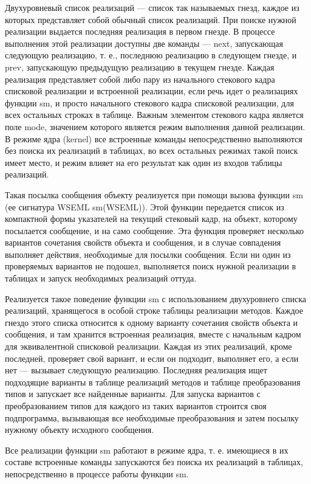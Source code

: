 \documentclass{report}
\begin{document}
    Двухуровневый список реализаций --- список так называемых гнезд, каждое из которых представляет собой обычный список реализаций. При поиске нужной реализации выдается последняя реализация в первом гнезде. В процессе выполнения этой реализации доступны две команды --- next, запускающая следующую реализацию, т. е., последнюю реализацию в следующем гнезде, и prev, запускающую предыдущую реализацию в текущем гнезде. Каждая реализация представляет собой либо пару из начального стекового кадра списковой реализации и встроенной реализации, если речь идет о реализациях функции sm, и просто начального стекового кадра списковой реализации, для всех остальных строках в таблице. Важным элементом стекового кадра является поле mode, значением которого является режим выполнения данной реализации. В режиме ядра (kernel) все встроенные команды непосредственно выполняются без поиска их реализаций в таблицах, во всех остальных режимах такой поиск имеет место, и режим влияет на его результат как один из входов таблицы реализаций.

    Такая посылка сообщения объекту реализуется при помощи вызова функции sm (ее сигнатура WSEML sm(WSEML)). Этой функции передается список из компактной формы указателей на текущий стековый кадр, на объект, которому посылается сообщение, и на само сообщение. Эта функция проверяет несколько вариантов сочетания свойств объекта и сообщения, и в случае совпадения выполняет действия, необходимые для посылки сообщения. Если ни один из проверяемых вариантов не подошел, выполняется поиск нужной реализации в таблицах и запуск необходимых реализаций оттуда.

    Реализуется такое поведение функции sm с использованием двухуровнего списка реализаций, хранящегося в особой строке таблицы реализации методов. Каждое гнездо этого списка относится к одному варианту сочетания свойств объекта и сообщения, и там хранится встроенная реализация, вместе с начальным кадром для эквивалентной списковой реализации. Каждая из этих реализаций, кроме последней, проверяет свой вариант, и если он подходит, выполняет его, а если нет --- вызывает следующую реализацию. Последняя реализация ищет подходящие варианты в таблице реализаций методов и таблице преобразования типов и запускает все найденные варианты. Для запуска вариантов с преобразованием типов для каждого из таких вариантов строится своя подпрограмма, вызывающая все необходимые преобразования и затем посылку нужному объекту исходного сообщения.

    Все реализации функции sm работают в режиме ядра, т. е. имеющиеся в их составе встроенные команды запускаются без поиска их реализаций в таблицах, непосредственно в процессе работы функции sm.
\end{document}
